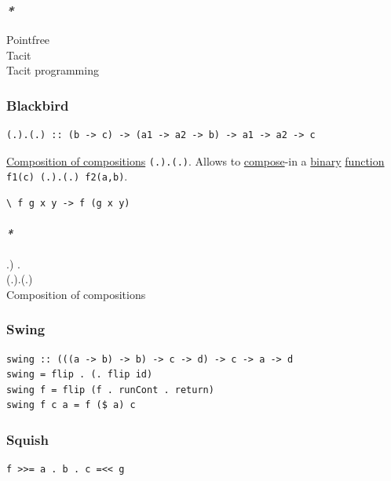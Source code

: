 \documentclass[11pt]{article}
\begin{document}
\subsubsection{\emph{*}}
\label{sec:org7873963}

\label{org1c8c25e}Pointfree\\
\label{orgb712b11}Tacit\\
\label{orge6b9785}Tacit programming\\

\subsubsection{\label{orgc7a3af3}Blackbird}
\label{sec:org77b4470}
\begin{verbatim}
(.).(.) :: (b -> c) -> (a1 -> a2 -> b) -> a1 -> a2 -> c
\end{verbatim}

\hyperref[orgc0c385c]{Composition of compositions} \texttt{(.).(.)}. Allows to \hyperref[orgb292e6e]{compose}-in a \hyperref[orgee106ab]{binary} \hyperref[orgeb5cddb]{function} \texttt{f1(c) (.).(.) f2(a,b)}.\\
\begin{verbatim}
\ f g x y -> f (g x y)
\end{verbatim}

\paragraph{\emph{*}}
\label{sec:org4fe09ff}

\label{orgea462a6}.) .\\
\label{org892f3ee}(.).(.)\\
\label{orgc0c385c}Composition of compositions\\

\subsubsection{\label{org71c2351}Swing}
\label{sec:orgdf16f0f}
\begin{verbatim}
swing :: (((a -> b) -> b) -> c -> d) -> c -> a -> d
swing = flip . (. flip id)
swing f = flip (f . runCont . return)
swing f c a = f ($ a) c
\end{verbatim}

\subsubsection{\label{org80ce0d8}Squish}
\label{sec:org617488c}
\begin{verbatim}
f >>= a . b . c =<< g
\end{verbatim}
\end{document}

